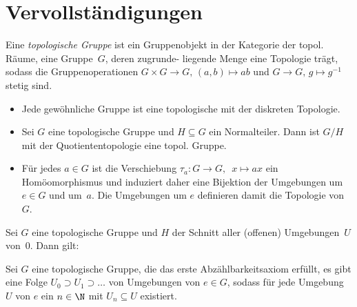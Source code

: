 \documentclass{cheat-sheet}
\newcommand{\clos}[1]{\overline{#1}} %
\begin{document}
\section{Vervollständigungen}



\begin{defn}
  Eine \emph{topologische Gruppe} ist ein Gruppenobjekt in der Kategorie der topol. Räume, \dh{} eine Gruppe~$G$, deren zugrunde- liegende Menge eine Topologie trägt, sodass die Gruppenoperationen $G \times G \to G, \, (a, b) \mapsto ab$ und $G \to G, \, g \mapsto g^{-1}$ stetig sind.
\end{defn}

\begin{bem}
  \begin{itemize}
    \item Jede gewöhnliche Gruppe ist eine topologische mit der diskreten Topologie.
    \item Sei $G$ eine topologische Gruppe und $H \subseteq G$ ein Normalteiler.
    Dann ist $G/H$ mit der Quotiententopologie eine topol. Gruppe.
    \item Für jedes $a \in G$ ist die Verschiebung $\tau_a : G \to G, \enspace x \mapsto ax$ ein Homöomorphismus und induziert daher eine Bijektion der Umgebungen um~$e \in G$ und um~$a$.
    Die Umgebungen um $e$ definieren damit die Topologie von~$G$.
  \end{itemize}
\end{bem}

\begin{lem}
  Sei $G$ eine topologische Gruppe und $H$ der Schnitt aller (offenen) Umgebungen~$U$ von~$0$.
  Dann gilt:
  \begin{itemize}
    \miniitem{0.4 \linewidth}{$H = \clos{\{ e \}}$}
  \end{itemize}
\end{lem}


\begin{voraussetzung}
  Sei $G$ eine topologische Gruppe, die das erste Abzählbarkeitsaxiom erfüllt, \dh{} es gibt eine Folge $U_0 \supset U_1 \supset \ldots$ von Umgebungen von $e \in G$, sodass für jede Umgebung $U$ von $e$ ein $n \in \N$ mit $U_n \subseteq U$ existiert.
\end{voraussetzung}
\end{document}

